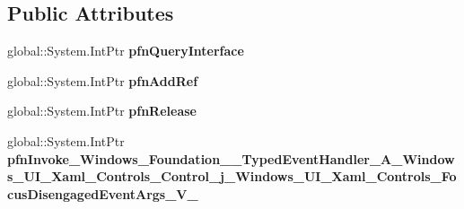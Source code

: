 \subsection*{Public Attributes}
\begin{DoxyCompactItemize}
\item 
\mbox{\label{struct_windows_1_1_foundation_1_1_typed_event_handler___a___windows___u_i___xaml___controls___cof52bacf1f8ce9dc6f9ea3c7dd11a16ef_a0d87fda3bd000bec9e9903b8abcb1b70}} 
global\+::\+System.\+Int\+Ptr {\bfseries pfn\+Query\+Interface}
\item 
\mbox{\label{struct_windows_1_1_foundation_1_1_typed_event_handler___a___windows___u_i___xaml___controls___cof52bacf1f8ce9dc6f9ea3c7dd11a16ef_a63fb3464f876ceadb4194a3e4695c3c9}} 
global\+::\+System.\+Int\+Ptr {\bfseries pfn\+Add\+Ref}
\item 
\mbox{\label{struct_windows_1_1_foundation_1_1_typed_event_handler___a___windows___u_i___xaml___controls___cof52bacf1f8ce9dc6f9ea3c7dd11a16ef_a88bb9d6430c8fa2984b58d5deab87f57}} 
global\+::\+System.\+Int\+Ptr {\bfseries pfn\+Release}
\item 
\mbox{\label{struct_windows_1_1_foundation_1_1_typed_event_handler___a___windows___u_i___xaml___controls___cof52bacf1f8ce9dc6f9ea3c7dd11a16ef_adca229232780ff74e8a82da42eec68fd}} 
global\+::\+System.\+Int\+Ptr {\bfseries pfn\+Invoke\+\_\+\+Windows\+\_\+\+Foundation\+\_\+\+\_\+\+Typed\+Event\+Handler\+\_\+\+A\+\_\+\+Windows\+\_\+\+U\+I\+\_\+\+Xaml\+\_\+\+Controls\+\_\+\+Control\+\_\+j\+\_\+\+Windows\+\_\+\+U\+I\+\_\+\+Xaml\+\_\+\+Controls\+\_\+\+Focus\+Disengaged\+Event\+Args\+\_\+\+V\+\_\+}
\end{DoxyCompactItemize}
